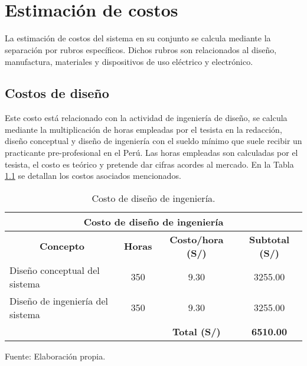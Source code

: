 
\pagestyle{myportland}
\doublespacing
\chapter[\quad\quad\quad\quad ----- Estimación de costos]{\\ Estimación de costos}
\thispagestyle{myportland}

La estimación de costos del sistema en su conjunto se calcula mediante la separación por rubros específicos. Dichos rubros son relacionados al diseño, manufactura, materiales y dispositivos de uso eléctrico y electrónico.
\section{Costos de diseño}

Este costo está relacionado con la actividad de ingeniería de diseño, se calcula mediante la multiplicación de horas empleadas por el tesista en la redacción, diseño conceptual y diseño de ingeniería con el sueldo mínimo que suele recibir un practicante pre-profesional en el Perú. Las horas empleadas son calculadas por el tesista, el costo es teórico y pretende dar cifras acordes al mercado. En la Tabla \ref{tab:costo de diseno de ingenieria} se detallan los costos asociados mencionados.

\begin{table}[H]
	\footnotesize\centering
	\caption{Costo de diseño de ingeniería.}
	\label{tab:costo de diseno de ingenieria}
	\begin{tabular}{lc|c|c|}
		\hline
		\multicolumn{4}{|c|}{\textbf{Costo de diseño de ingeniería}}  \\ \hline
		\multicolumn{1}{|c|}{\textbf{Concepto}} & \multicolumn{1}{c|}{\textbf{Horas}} & \multicolumn{1}{c|}{\textbf{Costo/hora (S/)}} & \multicolumn{1}{c|}{\textbf{Subtotal (S/)}} \\ \hline
		\multicolumn{1}{|l|}{Diseño conceptual del sistema} & 350 & 9.30 & 3255.00 \\ \hline
		\multicolumn{1}{|l|}{Diseño de ingeniería del sistema} & 350 & 9.30 & 3255.00 \\ \hline
		& & \textbf{Total (S/)} & \textbf{6510.00}  \\ \cline{3-4} 
	\end{tabular}
	\begin{myflushcenteraftertable}	
		Fuente: Elaboración propia.
	\end{myflushcenteraftertable}
\end{table}

